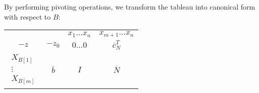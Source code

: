 By performing pivoting operations, we transform the tableau into canonical form with respect to $B$:
\begin{table}[H]
    \centering
    \begin{tabular}{cccc}
                                                                &                                           & $x_1 \dots x_n$                       & $x_{m+1}\dots x_n$                                \\ \cline{2-4}
    $-z$                                                        & \multicolumn{1}{|c|}{$-z_0$}              & \multicolumn{1}{c|}{$0 \dots 0$}      & \multicolumn{1}{c|}{$\overline{c}_N^T$}           \\ \cline{2-4}
    $\begin{matrix}X_{B[1]}\\\vdots\\X_{B[m]}\end{matrix}$      & \multicolumn{1}{|c|}{$\overline{b}$}      & \multicolumn{1}{c|}{$I$}              & \multicolumn{1}{c|}{$\overline{N}$}               \\ \cline{2-4}
    \end{tabular}
\end{table}
